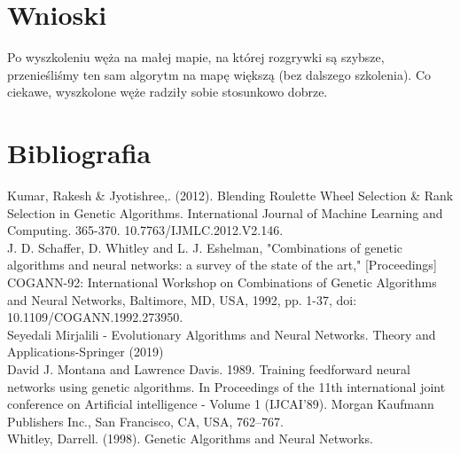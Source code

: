 \documentclass{article}
\begin{document}
\section{Wnioski} 
Po wyszkoleniu węża na małej mapie, na której rozgrywki są szybsze, przenieśliśmy ten sam algorytm na mapę większą (bez dalszego szkolenia). Co ciekawe, wyszkolone węże radziły sobie stosunkowo dobrze.
\section{Bibliografia}
Kumar, Rakesh & Jyotishree,. (2012). Blending Roulette Wheel Selection & Rank Selection in Genetic Algorithms. International Journal of Machine Learning and Computing. 365-370. 10.7763/IJMLC.2012.V2.146.  \\
J. D. Schaffer, D. Whitley and L. J. Eshelman, "Combinations of genetic algorithms and neural networks: a survey of the state of the art," [Proceedings] COGANN-92: International Workshop on Combinations of Genetic Algorithms and Neural Networks, Baltimore, MD, USA, 1992, pp. 1-37, doi: 10.1109/COGANN.1992.273950. \\
Seyedali Mirjalili - Evolutionary Algorithms and Neural Networks. Theory and Applications-Springer (2019) \\
David J. Montana and Lawrence Davis. 1989. Training feedforward neural networks using genetic algorithms. In Proceedings of the 11th international joint conference on Artificial intelligence - Volume 1 (IJCAI'89). Morgan Kaufmann Publishers Inc., San Francisco, CA, USA, 762–767. \\
Whitley, Darrell. (1998). Genetic Algorithms and Neural Networks. \\
\end{document}
